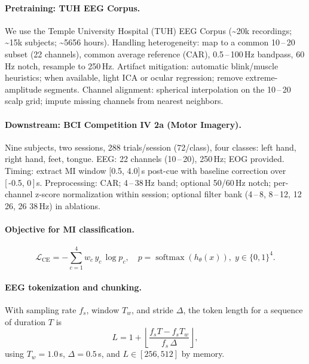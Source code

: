 \documentclass[letterpaper]{article}
\newcommand{\softmax}{\operatorname{softmax}}
\begin{document}
\paragraph{Pretraining: TUH EEG Corpus.} We use the Temple University Hospital (TUH) EEG Corpus (\textasciitilde20k recordings; \textasciitilde15k subjects; \textasciitilde5656 hours). Handling heterogeneity: map to a common 10\,--\,20 subset (22 channels), common average reference (CAR), 0.5\,--\,100\,Hz bandpass, 60\,Hz notch, resample to 250\,Hz. Artifact mitigation: automatic blink/muscle heuristics; when available, light ICA or ocular regression; remove extreme-amplitude segments. Channel alignment: spherical interpolation on the 10\,--\,20 scalp grid; impute missing channels from nearest neighbors.

\paragraph{Downstream: BCI Competition IV 2a (Motor Imagery).} Nine subjects, two sessions, 288 trials/session (72/class), four classes: left hand, right hand, feet, tongue. EEG: 22 channels (10\,--\,20), 250\,Hz; EOG provided. Timing: extract MI window [0.5, 4.0]\,s post-cue with baseline correction over [\,-0.5, 0\,]\,s. Preprocessing: CAR; 4\,--\,38\,Hz band; optional 50/60\,Hz notch; per-channel z-score normalization within session; optional filter bank (4\,--\,8, 8\,--\,12, 12\,\textendash\,26, 26\,\textendash\,38\,Hz) in ablations.

\paragraph{Objective for MI classification.}
\begin{equation}
\mathcal{L}_{\mathrm{CE}} = - \sum_{c=1}^{4} w_c \, y_c \, \log p_c, \quad p = \softmax(h_\theta(x)),\; y \in \{0,1\}^4.
\end{equation}

\paragraph{EEG tokenization and chunking.} With sampling rate $f_s$, window $T_w$, and stride $\Delta$, the token length for a sequence of duration $T$ is
\begin{equation}
L = 1 + \left\lfloor \frac{f_s T - f_s T_w}{f_s \, \Delta} \right\rfloor,
\end{equation}
using $T_w=1.0$\,s, $\Delta=0.5$\,s, and $L\in[256,512]$ by memory.
\end{document}
